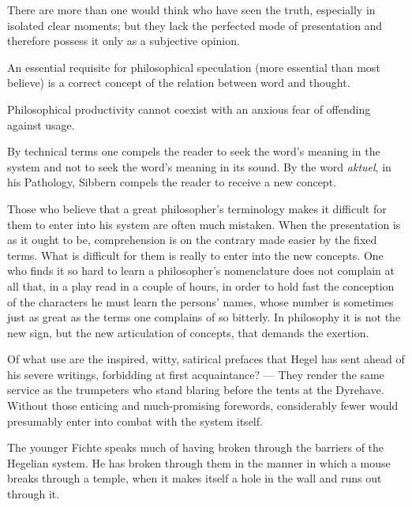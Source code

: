 \documentclass[12pt,a4paper]{article}
\newcommand{\opage}[1]{\marginnote{\footnotesize\textit{[#1]}}}
\newcommand{\aphsep}{\par\smallskip\centerline{\textasteriskcentered}\smallskip}
\begin{document}
\aphsep

There are more than one would think who have seen the truth, especially in
isolated clear moments; but they lack the perfected mode of presentation and
therefore possess it only as a subjective opinion.

\opage{20}An essential requisite for philosophical speculation (more essential
than most believe) is a correct concept of the relation between word and thought.

\aphsep

Philosophical productivity cannot coexist with an anxious fear of offending
against usage.

\aphsep

By technical terms one compels the reader to seek the word's meaning in the
system and not to seek the word's meaning in its sound. By the word
\textit{aktuel}, in his Pathology, Sibbern compels the reader to receive a new
concept.

\aphsep

Those who believe that a great philosopher's terminology makes it difficult for
them to enter into his system are often much mistaken. When the presentation is
as it ought to be, comprehension is on the contrary made easier by the fixed
terms. What is difficult for them is really to enter into the new concepts. One
who finds it so hard to learn a philosopher's nomenclature does not complain at
all that, in a play read in a couple of hours, in order to hold fast the
conception of the characters he must learn the persons' names, whose number is
sometimes just as great as the terms one complains of so bitterly. In philosophy
it is not the new sign, but the new articulation of concepts, that demands the
exertion.

\aphsep

Of what use are the inspired, witty, satirical prefaces that Hegel has sent ahead
of his severe writings, forbidding at first acquaintance? --- They render the
same service as the trumpeters who stand blaring before the tents at the
Dyrehave. Without those enticing and much-promising forewords, considerably fewer
would presumably enter into combat with the system itself.

\opage{21}The younger Fichte speaks much of having broken through the barriers of
the Hegelian system. He has broken through them in the manner in which a mouse
breaks through a temple, when it makes itself a hole in the wall and runs out
through it.

\aphsep
\end{document}

